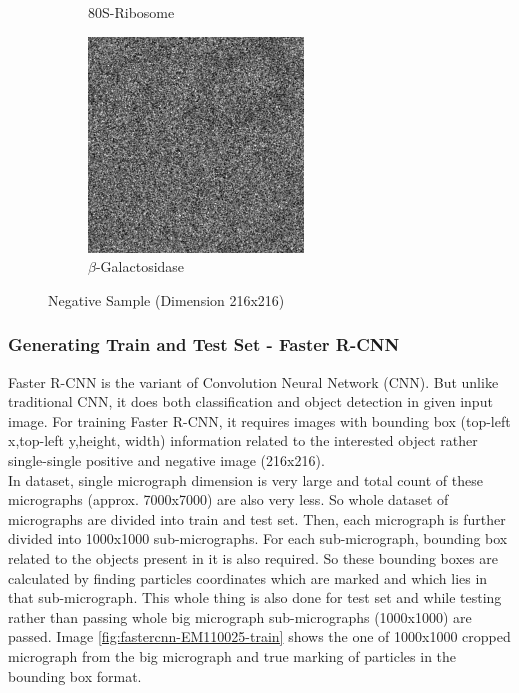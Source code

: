 \documentclass[twoside]{iitbreport}
\begin{document}
\begin{figure}[h]
\begin{subfigure}{.48\textwidth}
\captionsetup{justification=centering}
\caption{ 80S-Ribosome }
\end{subfigure}
\begin{subfigure}{.5\textwidth}
\centering
\includegraphics[width=0.5\linewidth]{neg-EM-10012.png}
\captionsetup{justification=centering}
\caption{$\beta$-Galactosidase }
\end{subfigure}
\caption{Negative Sample (Dimension 216x216)}
\label{fig:Negative-Projection}
\end{figure}

\subsubsection{Generating Train and Test Set - Faster R-CNN}\label{subsec:gen-train-test-faster-rcnn}
Faster R-CNN is the variant of Convolution Neural Network (CNN). But unlike traditional CNN, it does both classification and object detection in given input image. For training  Faster R-CNN, it requires images with bounding box (top-left x,top-left y,height, width) information related to the interested object rather single-single positive and negative image (216x216).\\

In dataset, single micrograph dimension is very large and total count of these micrographs (approx. 7000x7000) are also very less. So whole dataset of micrographs are divided into train and test set. Then, each micrograph is further divided into 1000x1000 sub-micrographs. For each sub-micrograph, bounding box related to the objects present in it is also required. So these bounding boxes are calculated by finding particles coordinates which are marked and which lies in that sub-micrograph. This whole thing is also done for test set and while testing rather than passing whole big micrograph sub-micrographs (1000x1000) are passed. Image \ref{fig:fastercnn-EM110025-train} shows the one of 1000x1000 cropped micrograph from the big micrograph and true marking of particles in the bounding box format.\\
\end{document}
